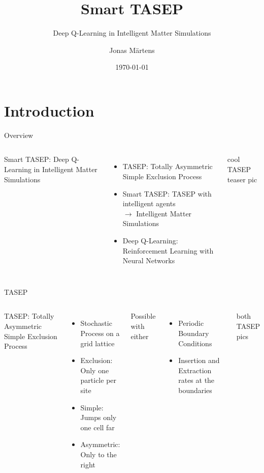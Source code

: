\documentclass[10pt,xcolor=table, aspectratio=1610]{beamer}
\title{Smart TASEP}
\subtitle{Deep Q-Learning in Intelligent Matter Simulations}
\date{\today}
\author{Jonas Märtens}
\institute{LMU Munich}
\begin{document}
\maketitle

\section{Introduction}
\begin{frame}{Overview}
    \begin{columns}
      Smart TASEP: Deep Q-Learning in Intelligent Matter Simulations
      \begin{itemize}
        \item TASEP: Totally Asymmetric Simple Exclusion Process
        \item Smart TASEP: TASEP with intelligent agents \\
              $\rightarrow$ Intelligent Matter Simulations
        \item Deep Q-Learning: Reinforcement Learning with Neural Networks
      \end{itemize}
      cool TASEP teaser pic
    \end{columns}
\end{frame}


\begin{frame}{TASEP}
    \begin{columns}
      TASEP: Totally Asymmetric Simple Exclusion Process
      \begin{itemize}
        \item Stochastic Process on a grid lattice
        \item Exclusion: Only one particle per site
        \item Simple: Jumps only one cell far 
        \item Asymmetric: Only to the right
      \end{itemize}
      Possible with either
      \begin{itemize}
        \item Periodic Boundary Conditions
        \item Insertion and Extraction rates at the boundaries
      \end{itemize}
      both TASEP pics
    \end{columns}
\end{frame}
\end{document}
